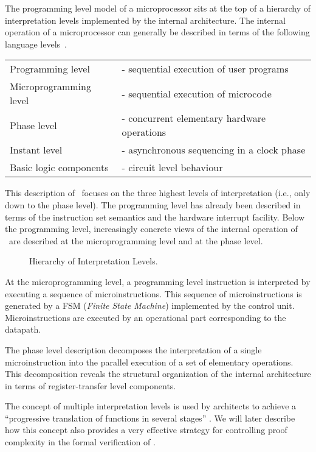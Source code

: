 The programming level model of a microprocessor sits at the top
of a hierarchy of interpretation levels
implemented by the internal architecture.
The internal operation of a
microprocessor can generally be
described in terms of the following language levels~\cite{Anceau}.

\begin{center}
\begin{tabular}{ll}
Programming level& - sequential execution of user programs\\
Microprogramming level& - sequential execution of microcode\\
Phase level& - concurrent elementary hardware operations\\
Instant level& - asynchronous sequencing in a clock phase\\
Basic logic components& - circuit level behaviour
\end{tabular}
\end{center}

This description of \Tamarack\ focuses on the three
highest levels
of interpretation (i.e., only down to the phase level).
The programming level has already
been described in terms of
the instruction set semantics and the hardware interrupt facility.
Below the programming level,
increasingly concrete views of
the internal operation of \Tamarack\ are described
at the microprogramming level and at the phase level.

\begin{figure}
\begin{center}


\caption{Hierarchy of Interpretation Levels.}
\label{fig-hier}
\end{center}
\end{figure}

At the microprogramming level,
a programming level instruction is interpreted by
executing a sequence of microinstructions.
This sequence of microinstructions
is generated by a FSM ({\it Finite State Machine})
implemented by the control unit.
Microinstructions are
executed by an operational part corresponding to the datapath.

The phase level description decomposes
the interpretation of a single microinstruction
into the parallel execution of a set of elementary operations.
This decomposition reveals the structural organization of the
internal architecture in terms of register-transfer level components.

The concept of multiple interpretation levels
is used by architects to achieve a ``progressive translation
of functions in several stages'' \cite{Anceau}.
We will later describe how this concept
also provides a very effective strategy for controlling proof complexity
in the formal verification of \Tamarack.

